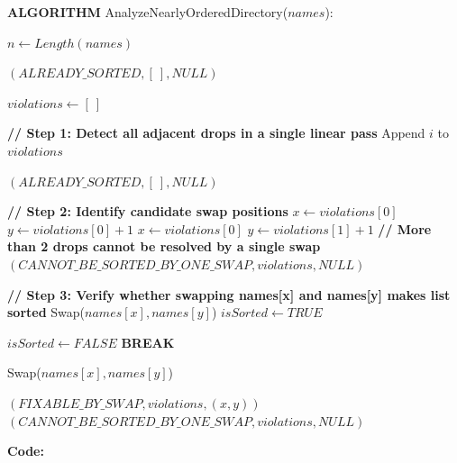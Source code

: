\documentclass[12pt]{article}
\begin{document}
\begin{algorithm}[H]
\caption{AnalyzeNearlyOrderedDirectory}
\begin{algorithmic}[1]

\State \textbf{ALGORITHM} AnalyzeNearlyOrderedDirectory($names$):

\State $n \gets Length(names)$

    \State \Return $(ALREADY\_SORTED, [\ ], NULL)$
\EndIf

\State $violations \gets [\ ]$

\State \textbf{// Step 1: Detect all adjacent drops in a single linear pass}
        \State Append $i$ to $violations$
    \EndIf
\EndFor

    \State \Return $(ALREADY\_SORTED, [\ ], NULL)$
\EndIf

\State \textbf{// Step 2: Identify candidate swap positions}
    \State $x \gets violations[0]$
    \State $y \gets violations[0] + 1$
    \State $x \gets violations[0]$
    \State $y \gets violations[1] + 1$
\Else
    \State \textbf{// More than 2 drops cannot be resolved by a single swap}
    \State \Return $(CANNOT\_BE\_SORTED\_BY\_ONE\_SWAP, violations, NULL)$
\EndIf

\State \textbf{// Step 3: Verify whether swapping names[x] and names[y] makes list sorted}
\State Swap($names[x], names[y]$)
\State $isSorted \gets TRUE$

        \State $isSorted \gets FALSE$
        \State \textbf{BREAK}
    \EndIf
\EndFor

\State Swap($names[x], names[y]$) 

    \State \Return $(FIXABLE\_BY\_SWAP, violations, (x,y))$
\Else
    \State \Return $(CANNOT\_BE\_SORTED\_BY\_ONE\_SWAP, violations, NULL)$
\EndIf

\end{algorithmic}
\end{algorithm}

\newpage
\textbf{Code:}
\end{document}
